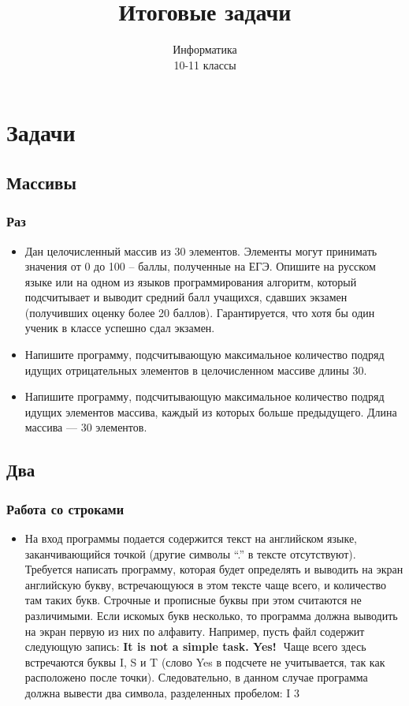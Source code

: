 \documentclass[compress,red]{beamer}
\title{Итоговые задачи}
\author{Информатика \\ 10-11 классы}
\begin{document}
\maketitle

\section{Задачи}

\subsection{Массивы}
\begin{frame}[fragile]
  \frametitle{Раз}
  \begin{itemize}
    \item Дан целочисленный массив из 30 элементов. Элементы могут принимать значения от 0 до 100 – баллы, полученные на ЕГЭ. Опишите на русском языке или на одном из языков программирования алгоритм, который подсчитывает и выводит средний балл учащихся, сдавших экзамен (получивших оценку более 20 баллов). Гарантируется, что хотя бы один ученик в классе успешно сдал экзамен.
    \item Напишите программу, подсчитывающую максимальное количество подряд идущих отрицательных элементов в целочисленном массиве длины 30.
    \item Напишите программу, подсчитывающую максимальное количество подряд идущих элементов массива, каждый из которых больше предыдущего. Длина массива — 30 элементов.
  \end{itemize}
\end{frame}

\subsection{Два}
\begin{frame}[fragile]
  \frametitle{Работа со строками}
  \begin{itemize}
    \item На вход программы подается содержится текст на английском языке, заканчивающийся точкой (другие символы “.” в тексте отсутствуют). Требуется написать программу, которая будет определять и выводить на экран английскую букву, встречающуюся в этом тексте чаще всего, и количество там таких букв. Строчные и прописные буквы при этом считаются не различимыми. Если искомых букв несколько, то программа должна выводить на экран первую из них по алфавиту. Например, пусть файл содержит следующую запись: \textbf{It is not a simple task. Yes!}  Чаще всего здесь встречаются буквы I, S и T (слово Yes в подсчете не учитывается, так как расположено после точки). Следовательно, в данном случае программа должна вывести два символа, разделенных пробелом: I 3
  \end{itemize}
\end{frame}
\end{document}
